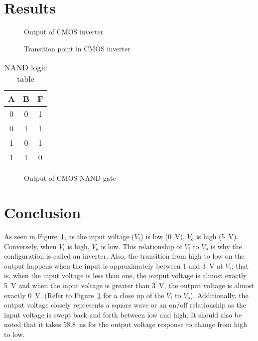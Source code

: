 \newpage

\section{Results}
\label{sec:results}

\begin{figure}[hbtp]
  \centering
  \resizebox{1.0\textwidth}{!}{}
  \caption{\label{fig:inverter} Output of CMOS inverter}
\end{figure}

\begin{figure}[hbtp]
  \centering
  \resizebox{1.0\textwidth}{!}{}
  \caption{\label{fig:data2} Transition point in CMOS inverter}
\end{figure}


\begin{table}[hbtp]
  \centering
  \begin{tabular}{cc|c}
    A & B & F \\
    \hline
    0 & 0 & 1 \\
    0 & 1 & 1 \\
    1 & 0 & 1 \\
    1 & 1 & 0 \\
  \end{tabular}
  \caption{\label{tab:nand} NAND logic table}
  \end{table}

\begin{figure}[hbtp]
  \centering
  \resizebox{1.0\textwidth}{!}{}
  \caption{\label{fig:nand} Output of CMOS NAND gate}
\end{figure}

\newpage

\section{Conclusion}
\label{sec:conclusion}

As seen in Figure~\ref{fig:inverter}, as the input voltage ($V_i$) is low (\SI{0}{V}), $V_o$ is high (\SI{5}{V}).  Conversely, when $V_i$ is high, $V_o$ is low. This relationship of $V_i$ to $V_o$ is why the configuration is called an inverter.  Also, the transition from high to low on the output happens when the input is approximately between 1 and \SI{3}{V} at $V_i$; that is, when the input voltage is less than one, the output voltage is almost exactly \SI{5}{V} and when the input voltage is greater than \SI{3}{V}, the output voltage is almost exactly \SI{0}{V}.  (Refer to Figure~\ref{fig:inverter} for a close up of the $V_i$ to $V_o$).  Additionally, the output voltage closely represents a square wave or an on/off relationship as the input voltage is swept back and forth between low and high.  It should also be noted that it takes \SI{58.8}{\nano\second} for the output voltage response to change from high to low.

